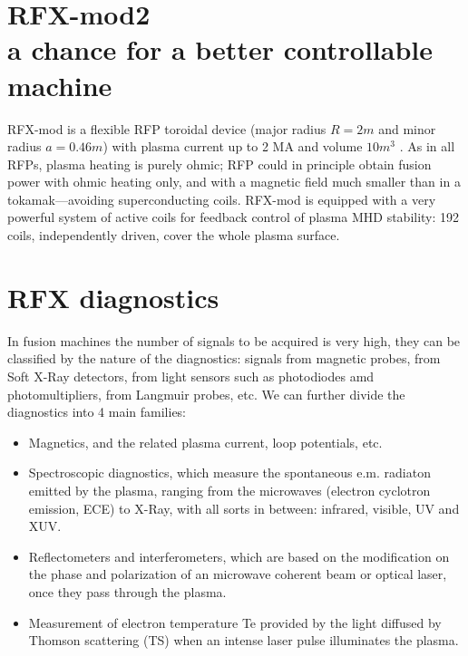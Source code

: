 
\section{RFX-mod2 \\ \small{a chance for a better controllable machine}}
RFX-mod is a flexible \ac{RFP} toroidal device (major radius $R=2 m$ and minor radius $a=0.46 m$) with plasma current up to 2 MA and volume $10 m^3$ \cite{SONATO2003161, doi:10.1063/1.4806765, SONATO200597, martin_RFX_overview}. As in all RFPs, plasma heating is purely ohmic; \acl{RFP} could in principle obtain fusion power with ohmic heating only, and with a magnetic field much smaller than in a tokamak—avoiding superconducting coils. RFX-mod is equipped with a very powerful system of active coils for feedback control of plasma MHD stability: 192 coils, independently driven, cover the whole plasma surface.


\section{RFX diagnostics}
In fusion machines the number of signals to be acquired is very high, they can be classified by the nature of the diagnostics:
signals from magnetic probes, from Soft X-Ray detectors, from light sensors such as photodiodes amd photomultipliers, from Langmuir probes, etc.
%
We can further divide the diagnostics into 4 main families:
\begin{itemize}
    \item Magnetics, and the related plasma current, loop potentials, etc.
    \item Spectroscopic diagnostics, which measure the spontaneous e.m. radiaton emitted by the plasma, ranging from the microwaves (electron cyclotron emission, ECE) to X-Ray, with all sorts in between: infrared, visible, UV and XUV. 
    \item Reflectometers and interferometers, which are based on the modification on the phase and polarization of an microwave coherent beam or optical laser, once they pass through the plasma.  
    \item Measurement of electron temperature Te provided by the light diffused by Thomson scattering (TS) when an intense laser pulse illuminates the plasma.
\end{itemize}

